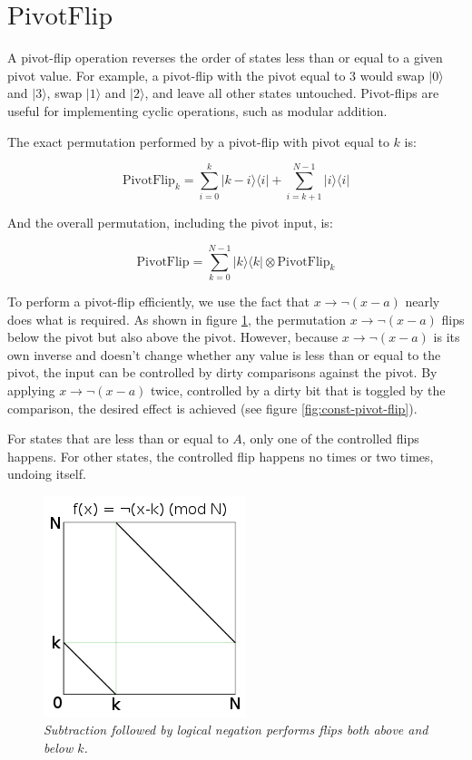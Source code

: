 \documentclass[twocolumn]{article}
\begin{document}
\section{$\text{PivotFlip}$}

A pivot-flip operation reverses the order of states less than or equal to a given pivot value.
For example, a pivot-flip with the pivot equal to 3 would swap $|0\rangle$ and $|3\rangle$, swap $|1\rangle$ and $|2\rangle$, and leave all other states untouched.
Pivot-flips are useful for implementing cyclic operations, such as modular addition.

The exact permutation performed by a pivot-flip with pivot equal to $k$ is:

$$\text{PivotFlip}_k = \sum_{i=0}^k |k-i\rangle \langle i| + \sum_{i=k+1}^{N-1} |i\rangle \langle i|$$

And the overall permutation, including the pivot input, is:

$$\text{PivotFlip} = \sum_{k=0}^{N-1} |k\rangle \langle k| \otimes \text{PivotFlip}_{k}$$

To perform a pivot-flip efficiently, we use the fact that $x \rightarrow \lnot(x - a)$ nearly does what is required.
As shown in figure \ref{fig:double-flip}, the permutation $x \rightarrow \lnot(x - a)$ flips below the pivot but also above the pivot.
However, because $x \rightarrow \lnot(x - a)$ is its own inverse and doesn't change whether any value is less than or equal to the pivot, the input can be controlled by dirty comparisons against the pivot.
By applying $x \rightarrow \lnot(x - a)$ twice, controlled by a dirty bit that is toggled by the comparison, the desired effect is achieved (see figure \ref{fig:const-pivot-flip}).

For states that are less than or equal to $A$, only one of the controlled flips happens.
For other states, the controlled flip happens no times or two times, undoing itself.

\begin{figure}
  \centering
  \includegraphics[totalheight=4cm]{double-flip.png}
  \caption{\em Subtraction followed by logical negation performs flips both above and below $k$.}
  \label{fig:double-flip}
\end{figure}
\end{document}
